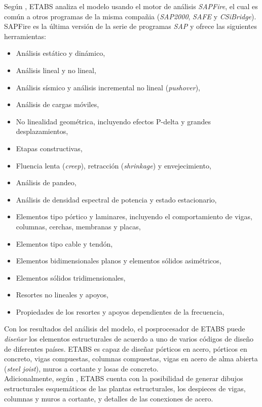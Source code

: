 Según \cite{ETABS2017analysisreferencemanual}, ETABS analiza el modelo usando el motor de análisis \emph{SAPFire}, el cual es común a otros programas de la misma compañia (\emph{SAP2000}, \emph{SAFE} y \emph{CSiBridge}). SAPFire es la última versión de la serie de programas \emph{SAP} y ofrece las siguientes herramientas:
\begin{itemize}
    \item Análisis estático y dinámico,
    \item Análisis lineal y no lineal,
    \item Análisis sísmico y análisis incremental no lineal (\emph{pushover}),
    \item Análisis de cargas móviles,
    \item No linealidad geométrica, incluyendo efectos P-delta y grandes desplazamientos,
    \item Etapas constructivas,
    \item Fluencia lenta (\emph{creep}), retracción (\emph{shrinkage}) y envejecimiento,
    \item Análisis de pandeo,
    \item Análisis de densidad espectral de potencia y estado estacionario,
    \item Elementos tipo pórtico y laminares, incluyendo el comportamiento de vigas, columnas, cerchas, membranas y placas,
    \item Elementos tipo cable y tendón,
    \item Elementos bidimensionales planos y elementos sólidos asimétricos,
    \item Elementos sólidos tridimensionales,
    \item Resortes no lineales y apoyos,
    \item Propiedades de los resortes y apoyos dependientes de la frecuencia,
\end{itemize}

Con los resultados del análisis del modelo, el posprocesador de ETABS puede \emph{diseñar} los elementos estructurales de acuerdo a uno de varios códigos de diseño de diferentes países. ETABS es capaz de diseñar pórticos en acero, pórticos en concreto, vigas compuestas, columnas compuestas, vigas en acero de alma abierta (\emph{steel joist}), muros a cortante y losas de concreto.\\

Adicionalmente, según \cite{ETABS2019welcome}, ETABS cuenta con la posibilidad de generar dibujos estructurales esquemáticos de las plantas estructurales, los despieces de vigas, columnas y muros a cortante, y detalles de las conexiones de acero.\\

